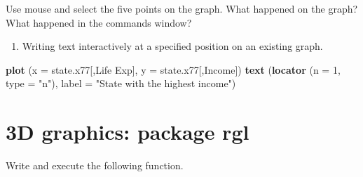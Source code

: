 \documentclass[
]{book}
\newenvironment{Shaded}{\begin{snugshade}}{\end{snugshade}}
\newcommand{\AttributeTok}[1]{\textcolor[rgb]{0.13,0.29,0.53}{#1}}
\newcommand{\DecValTok}[1]{\textcolor[rgb]{0.00,0.00,0.81}{#1}}
\newcommand{\FunctionTok}[1]{\textcolor[rgb]{0.13,0.29,0.53}{\textbf{#1}}}
\newcommand{\NormalTok}[1]{#1}
\newcommand{\StringTok}[1]{\textcolor[rgb]{0.31,0.60,0.02}{#1}}
\providecommand{\tightlist}{%
  \setlength{\itemsep}{0pt}\setlength{\parskip}{0pt}}
\begin{document}
Use mouse and select the five points on the graph. What happened on the graph? What happened in the commands window?

\begin{enumerate}
\def\labelenumi{(\roman{enumi})}
\setcounter{enumi}{1}
\tightlist
\item
  Writing text interactively at a specified position on an existing graph.
\end{enumerate}

\begin{Shaded}
\begin{Highlighting}[]
\FunctionTok{plot}\NormalTok{ (}\AttributeTok{x =}\NormalTok{ state.x77[,}\StringTok{\textquotesingle{}Life Exp\textquotesingle{}}\NormalTok{], }\AttributeTok{y =}\NormalTok{ state.x77[,}\StringTok{\textquotesingle{}Income\textquotesingle{}}\NormalTok{])}
\FunctionTok{text}\NormalTok{ (}\FunctionTok{locator}\NormalTok{ (}\AttributeTok{n =} \DecValTok{1}\NormalTok{, }\AttributeTok{type =} \StringTok{"n"}\NormalTok{), }\AttributeTok{label =} \StringTok{"State with the highest income"}\NormalTok{)}
\end{Highlighting}
\end{Shaded}

\section{3D graphics: package rgl}\label{d-graphics-package-rgl}

Write and execute the following function.
\end{document}
